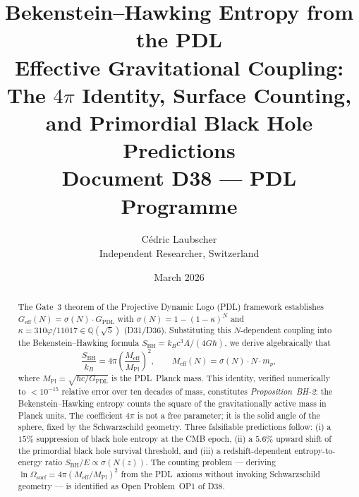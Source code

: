 \documentclass[11pt,a4paper]{article}
\theoremstyle{definition}
\newcommand{\PDL}{\textnormal{PDL}}
\newcommand{\vp}{\varphi}
\newcommand{\kap}{\kappa}
\newcommand{\sig}{\sigma}
\newcommand{\GPDL}{G_{\mathrm{PDL}}}
\newcommand{\Geff}{G_{\mathrm{eff}}}
\newcommand{\hb}{\hbar}
\newcommand{\SBH}{S_{\mathrm{BH}}}
\newcommand{\Meff}{M_{\mathrm{eff}}}
\newcommand{\MPl}{M_{\mathrm{Pl}}}
\newcommand{\Omsurf}{\Omega_{\mathrm{surf}}}
\begin{document}
\title{\textbf{Bekenstein--Hawking Entropy from the PDL\\
Effective Gravitational Coupling:\\
The $4\pi$ Identity, Surface Counting,\\
and Primordial Black Hole Predictions}\\[4pt]
\large Document D38 --- PDL Programme}
\author{C\'edric Laubscher\\
\small Independent Researcher, Switzerland}
\date{March 2026}

\maketitle

\begin{abstract}
The Gate~3 theorem of the Projective Dynamic Logo (\PDL) framework establishes
$\Geff(N) = \sig(N)\cdot\GPDL$ with $\sig(N) = 1-(1-\kap)^N$ and
$\kap = 310\vp/11017 \in \mathbb{Q}(\sqrt{5})$ (D31/D36). Substituting this
$N$-dependent coupling into the Bekenstein--Hawking formula
$\SBH = k_B c^3 A / (4G\hb)$, we derive algebraically that
\begin{equation*}
\frac{\SBH}{k_B} = 4\pi\left(\frac{\Meff}{\MPl}\right)^2,
\qquad
\Meff(N) = \sig(N)\cdot N\cdot m_p,
\end{equation*}
where $\MPl = \sqrt{\hb c/\GPDL}$ is the \PDL\ Planck mass.
This identity, verified numerically to $< 10^{-15}$ relative error over ten
decades of mass, constitutes \emph{Proposition~BH-2}: the Bekenstein--Hawking
entropy counts the square of the gravitationally active mass in Planck units.
The coefficient $4\pi$ is not a free parameter; it is the solid angle of the
sphere, fixed by the Schwarzschild geometry. Three falsifiable predictions
follow: (i) a $15\%$ suppression of black hole entropy at the CMB epoch,
(ii) a $5.6\%$ upward shift of the primordial black hole survival threshold,
and (iii) a redshift-dependent entropy-to-energy ratio $S_\mathrm{BH}/E \propto \sig(N(z))$.
The counting problem --- deriving $\ln\Omsurf = 4\pi(\Meff/\MPl)^2$ from
the \PDL\ axioms without invoking Schwarzschild geometry --- is identified as
Open Problem~OP1 of D38.
\end{abstract}

\newpage

\tableofcontents
\newpage

\end{document}
